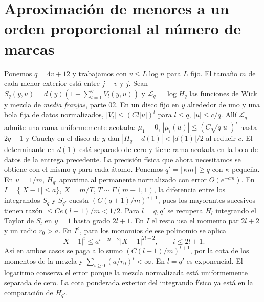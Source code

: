 \section{Aproximación de menores a un orden proporcional al número de marcas}
Ponemos $q=4v+12$ y trabajamos con $v\le L\log n$ para $L$ fijo. El tamaño $m$ de cada
menor exterior está entre $j-v$ y $j$. Sean $S_q(y,u)=d(y)(1+\sum_{l=1}^q V_l(y,u))$
y $\mathcal L_q=\log H_q$ las funciones de Wick y mezcla de \emph{media franjas}, parte 02.
En un disco fijo en $y$ alrededor de uno y una bola fija de datos normalizados,
$|V_l|\le(Cl|u|)^l$ para $l\le q$, $|u|\le c/q$. Allí $\mathcal L_q$ admite una rama
uniformemente acotada: $\mu_1=0$, $|\mu_i(u)|\le(C\sqrt{q|u|})^i$ hasta $2q+1$ y Cauchy
en el disco de $y$ dan $|H_q-d(1)|<|d(1)|/2$ al reducir $c$. El determinante en $d(1)$
está separado de cero y tiene rama acotada en la bola de datos de la entrega precedente.
La precisión física que ahora necesitamos se obtiene con el mismo
$q$ para cada átomo. Ponemos $q'=\lfloor\kappa m\rfloor\ge q$ con $\kappa$ pequeña.
En $u=1/m$, $H_{q'}$ aproxima al permanente normalizado con error $O(e^{-cm})$.
En $I=\{|X-1|\le a\}$, $X=m/T$, $T\sim\Gamma(m+1,1)$, la diferencia entre los integrandos
$S_q$ y $S_{q'}$ cuesta $(C(q+1)/m)^{q+1}$, pues los mayorantes sucesivos tienen razón
$\le Ce(l+1)/m<1/2$. Para $l=q,q'$ se recupera $H_l$ integrando el Taylor de $S_l$ en
$y=1$ hasta grado $2l+1$. En $I$ el resto usa el momento par $2l+2$ y un radio $r_0>a$.
En $I^c$, para los monomios de ese polinomio se aplica
\[
 |X-1|^i\le a^{i-2l-2}|X-1|^{2l+2},\qquad i\le2l+1 .
\]
Así en ambos casos se paga a lo sumo $(C(l+1)/m)^{l+1}$, por la cota de los momentos
de la mezcla y $\sum_{i\ge0}(a/r_0)^i<\infty$. En $l=q'$ es exponencial. El logaritmo
conserva el error porque la mezcla normalizada está uniformemente separada de cero.
La cota ponderada exterior del integrando físico ya está en la comparación de $H_{q'}$.
